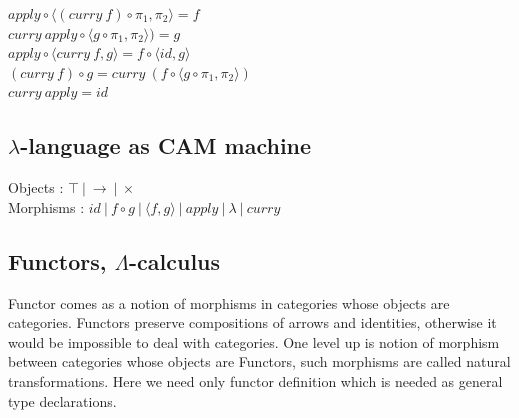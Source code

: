 \documentclass[11pt,oneside]{article}
\begin{document}
\begingroup
\parbox[t][][l]{0.40\textwidth}{

\begin{prooftree}
\end{prooftree}

\begin{prooftree}
\end{prooftree}

\begin{prooftree}
\end{prooftree}

}
\hspace{0.1cm}
\parbox[t][][r]{0.60\textwidth}{

\begin{center}
$apply \circ \langle (curry\ f) \circ \pi_1 , \pi_2 \rangle = f$\\
$curry\ apply \circ \langle g \circ \pi_1, \pi_2 \rangle) = g$\\
$apply \circ \langle curry\ f, g \rangle = f \circ \langle id , g\rangle$\\
$(curry\ f) \circ g = curry\ (f \circ \langle g \circ \pi_1,\pi_2\rangle)$\\
$curry\ apply = id$\\
\end{center}


}
\endgroup

\subsection*{$\lambda$-language as CAM machine}

\begin{center}
Objects : $\top\ |\ \rightarrow\ |\ \times$\\
Morphisms : $id\ |\ f \circ g\ |\ \langle f, g \rangle\ |\ apply\ |\ \lambda\ |\ curry$
\end{center}

\newpage
  \subsection{Functors, $\Lambda$-calculus}

  Functor comes as a notion of morphisms in categories whose objects are categories.
  Functors preserve compositions of arrows and identities, otherwise it would
  be impossible to deal with categories. One level up is notion of morphism between categories whose
  objects are Functors, such morphisms are called natural transformations. Here we need
  only functor definition which is needed as general type declarations.
\end{document}

